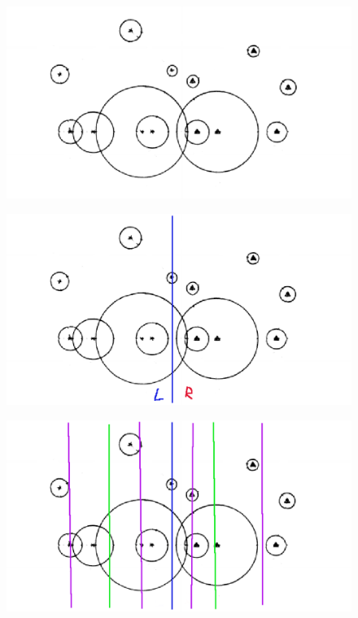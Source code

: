 \documentclass[12pt]{article}
\begin{document}
\begin{CJK}{UTF8}{bkai}
\begin{figure}[h]
\includegraphics[scale=0.4]{figure3.eps}
\caption{}
\end{figure}

\begin{figure}[h]
\includegraphics[scale=0.4]{figure4.eps}
\caption{}
\end{figure}

\begin{figure}[h]
\includegraphics[scale=0.4]{figure5.eps}
\caption{}
\end{figure}


\end{CJK}
\end{document}
